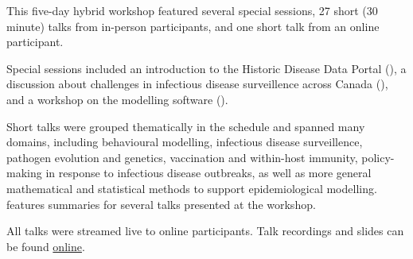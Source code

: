 This five-day hybrid workshop featured several special sessions, 27 short (30 minute) talks from in-person participants, and one short talk from an online participant. 

Special sessions included an introduction to the Historic Disease Data Portal (), a discussion about challenges in infectious disease surveillence across Canada (), and a workshop on the \macpan modelling software ().

Short talks were grouped thematically in the schedule and spanned many domains, including behavioural modelling, infectious disease surveillence, pathogen evolution and genetics, vaccination and within-host immunity, policy-making in response to infectious disease outbreaks, as well as more general mathematical and statistical methods to support epidemiological modelling.  features summaries for several talks presented at the workshop. 

All talks were streamed live to online participants. Talk recordings and slides can be found \href{https://www.birs.ca/events/2023/5-day-workshops/23w5151}{online}. 